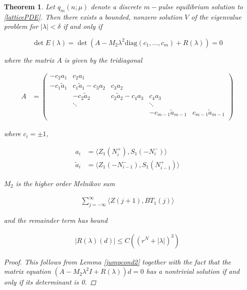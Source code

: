 \documentclass[12pt]{article}
\newtheorem{theorem}{Theorem}
\begin{document}
\begin{theorem}\label{jumpmatrix}
Let $q_m(n; \mu)$ denote a discrete $m-$pulse equilibrium solution to \eqref{latticePDE}. Then there exists a bounded, nonzero solution $V$ of the eigenvalue problem for $|\lambda| < \delta$ if and only if 

\begin{equation}
\det E(\lambda) = \det(A - M_2 \lambda^2 \text{diag}(c_1, \dots, c_m) + R(\lambda) ) = 0
\end{equation}

where the matrix $A$ is given by the tridiagonal

\begin{align*}
A &= \begin{pmatrix}
-c_2 a_1 & c_2 a_1 & & &  \\
-c_1 \tilde{a}_1 & c_1 \tilde{a}_1 - c_3 a_2 & c_3 a_2 \\
& -c_2 \tilde{a}_2 & c_2 \tilde{a}_2 - c_4 a_3 & c_4 a_3 \\
& \ddots & & \ddots \\
& & & -c_{m-1} \tilde{a}_{m-1} & c_{m-1} \tilde{a}_{m-1}  \\
\end{pmatrix}
\end{align*}

where $c_i = \pm 1$,

\begin{align*}
a_i &= \langle Z_1(N_i^+), S_1(-N_i^-) \rangle \\
\tilde{a}_i &= \langle Z_1(-N_{i-1}^-), S_1(N_{i-1}^+) \rangle
\end{align*}

$M_2$ is the higher order Melnikov sum

\begin{align}\label{M2}
\sum_{j = -\infty}^{\infty} \langle Z(j+1), B T_1(j)\rangle
\end{align}

and the remainder term has bound

\begin{align}\label{Rbound2}
|R(\lambda)(d)| \leq C\left( (r^N + |\lambda|)^3 \right)
\end{align}

\begin{proof}
This follows from Lemma \ref{jumpcond2} together with the fact that the matrix equation $(A - M_2 \lambda^2 I + R(\lambda) )d = 0$ has a nontrivial solution if and only if its determinant is 0.
\end{proof}

\end{theorem}
\end{document}

